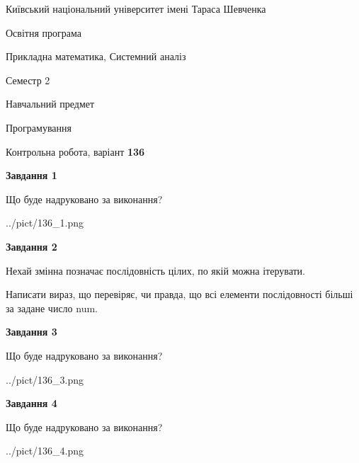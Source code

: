 \documentclass[12pt, ukrainian]{article}
\begin{document}
{{\begin {small}\par
{ \center  Київський національний університет імені Тараса Шевченка \par}
{\parbox {5 cm}{Освітня програма \hfill}{\parbox {8 cm}{Прикладна математика, Системний аналіз \hfill}}\parbox {5 cm}{\hfill Семестр 2}}\par
{\parbox {5 cm} {Навчальний предмет \hfill}\parbox {7 cm}{Програмування \hfill}\parbox {6cm}{\hfill}\par}\vspace{-7pt} \end{small}}{\center Контрольна робота, варіант  \No \textbf
{ 136 }\par}}
{
\begin {large}
{\begin {center}\textbf{Завдання 1}\end {center}}\par
Що буде надруковано за виконання?\par\par
\begin{center}
	{../pict/136_1.png}
\end{center}
\newpage

{\begin {center}\textbf{Завдання 2}\end {center}}\par
Нехай змінна  позначає послідовність цілих, по якій можна ітерувати.

Написати вираз, що перевіряє, чи правда, що всі елементи послідовності більші за задане число num.\par
\newpage

{\begin {center}\textbf{Завдання 3}\end {center}}\par
Що буде надруковано за виконання?\par
\begin{center}
	{../pict/136_3.png}
\end{center}
\newpage

{\begin {center}\textbf{Завдання 4}\end {center}}\par
Що буде надруковано за виконання?\par
\begin{center}
	{../pict/136_4.png}
\end{center}
\newpage


\end{large}}
\end{document}
